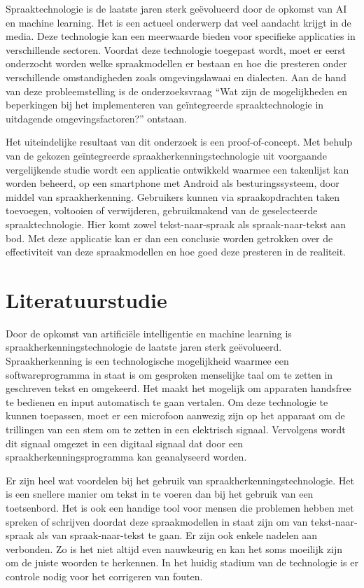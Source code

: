 Spraaktechnologie is de laatste jaren sterk geëvolueerd door de opkomst van AI en machine learning. Het is een actueel onderwerp dat veel aandacht krijgt in de media. Deze technologie kan een meerwaarde bieden voor specifieke applicaties in verschillende sectoren. Voordat deze technologie toegepast wordt, moet er eerst onderzocht worden welke spraakmodellen er bestaan en hoe die presteren onder verschillende omstandigheden zoals omgevingslawaai en dialecten. Aan de hand van deze probleemstelling is de onderzoeksvraag ``Wat zijn de mogelijkheden en beperkingen bij het implementeren van geïntegreerde spraaktechnologie in uitdagende omgevingsfactoren?'' ontstaan.

Het uiteindelijke resultaat van dit onderzoek is een proof-of-concept. Met behulp van de gekozen geïntegreerde spraakherkenningstechnologie uit voorgaande vergelijkende studie wordt een applicatie ontwikkeld waarmee een takenlijst kan worden beheerd, op een smartphone met Android als besturingssysteem, door middel van spraakherkenning. 
Gebruikers kunnen via spraakopdrachten taken toevoegen, voltooien of verwijderen, gebruikmakend van de geselecteerde spraaktechnologie. Hier komt zowel tekst-naar-spraak als spraak-naar-tekst aan bod. Met deze applicatie kan er dan een conclusie worden getrokken over de effectiviteit van deze spraakmodellen en hoe goed deze presteren in de realiteit. 



\section{Literatuurstudie}%
\label{sec:literatuurstudie}

Door de opkomst van artificiële intelligentie en machine learning is spraakherkenningstechnologie de laatste jaren sterk geëvolueerd. Spraakherkenning is een technologische mogelijkheid waarmee een softwareprogramma in staat is om gesproken menselijke taal om te zetten in geschreven tekst en omgekeerd. Het maakt het mogelijk om apparaten handsfree te bedienen en input automatisch te gaan vertalen. Om deze technologie te kunnen toepassen, moet er een microfoon aanwezig zijn op het apparaat om de trillingen van een stem om te zetten in een elektrisch signaal. Vervolgens wordt dit signaal omgezet in een digitaal signaal dat door een spraakherkenningsprogramma kan geanalyseerd worden.\autocite{Zwass2022}

Er zijn heel wat voordelen bij het gebruik van spraakherkenningstechnologie. Het is een snellere manier om tekst in te voeren dan bij het gebruik van een toetsenbord. Het is ook een handige tool voor mensen die problemen hebben met spreken of schrijven doordat deze spraakmodellen in staat zijn om van tekst-naar-spraak als van spraak-naar-tekst te gaan. Er zijn ook enkele nadelen aan verbonden. Zo is het niet altijd even nauwkeurig en kan het soms moeilijk zijn om de juiste woorden te herkennen. In het huidig stadium van de technologie is er controle nodig voor het corrigeren van fouten. \autocite{RingCentral2021}

